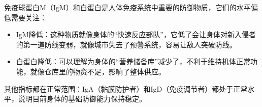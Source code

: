 \documentclass[UTF8]{ctexart}
\begin{document}
\begin{center}
\end{center}

\begin{tcolorbox}[
    enhanced,
    colback=gray!3,
    colframe=gray!3,
    arc=3mm,
    boxrule=0pt,
    width=\textwidth,
    top=8pt,
    bottom=8pt
]
{\small{\textcolor{yellow!85!orange}{\faLightbulb}}\quad 免疫球蛋白M（IgM）和白蛋白是人体免疫系统中重要的防御物质，它们的水平偏低需要关注：
\begin{itemize}
    \item IgM降低：这种物质就像身体的“快速反应部队”，它低了会让身体对新入侵者的第一道防线变弱，就像城市失去了预警系统，容易让敌人突破防线。
    \item 白蛋白降低：可以理解为身体的“营养储备库”减少了，不利于维持机体正常功能，就像仓库里的物资不足，影响了整体供应。
\end{itemize}
{\textcolor{green!85!orange}{\faLightbulb}}\quad 其他指标都在正常范围：IgA（黏膜防护者）和IgD（免疫调节者）都处于正常水平，说明目前身体的基础防御能力保持稳定。
}

\end{tcolorbox}

\newpage
\end{document}

